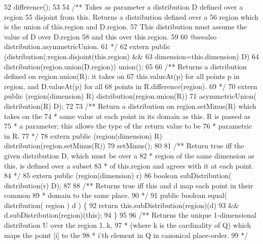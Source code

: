 \begin{tightcode}
\quad\num{52}        difference();
\quad\num{53}
\quad\num{54}    /** Takes as parameter a distribution D defined over a region
\quad\num{55}        disjoint from this. Returns a distribution defined over a
\quad\num{56}        region which is the union of this.region and D.region.
\quad\num{57}        This distribution must assume the value of D over D.region
\quad\num{58}        and this over this.region.
\quad\num{59}
\quad\num{60}        @seealso distribution.asymmetricUnion.
\quad\num{61}     */
\quad\num{62}    extern public (distribution(:region.disjoint(this.region) &&
\quad\num{63}                                dimension=this.dimension) D)
\quad\num{64}        distribution(region.union(D.region)) union();
\quad\num{65}
\quad\num{66}    /** Returns a distribution defined on region.union(R): it takes on
\quad\num{67}        this.valueAt(p) for all points p in region, and D.valueAt(p) for all
\quad\num{68}        points in R.difference(region).
\quad\num{69}     */
\quad\num{70}    extern public (region(dimension) R) distribution(region.union(R))
\quad\num{71}        asymmetricUnion( distribution(R) D);
\quad\num{72}
\quad\num{73}    /** Return a distribution on region.setMinus(R) which takes on the
\quad\num{74}     * same value at each point in its domain as this. R is passed as
\quad\num{75}     * a parameter; this allows the type of the return value to be
\quad\num{76}     * parametric in R.
\quad\num{77}     */
\quad\num{78}    extern public (region(dimension) R) distribution(region.setMinus(R))
\quad\num{79}        setMinus();
\quad\num{80}
\quad\num{81}    /** Return true iff the given distribution D, which must be over a
\quad\num{82}     * region of the same dimension as this, is defined over a subset
\quad\num{83}     * of this.region and agrees with it at each point.
\quad\num{84}     */
\quad\num{85}    extern public (region(dimension) r)
\quad\num{86}        boolean subDistribution( distribution(r) D);
\quad\num{87}
\quad\num{88}    /** Returns true iff this and d map each point in their common
\quad\num{89}     * domain to the same place.
\quad\num{90}     */
\quad\num{91}    public boolean equal( distribution( region ) d ) \{
\quad\num{92}        return this.subDistribution(region)(d)
\quad\num{93}            && d.subDistribution(region)(this);
\quad\num{94}    \}
\quad\num{95}
\quad\num{96}    /** Returns the unique 1-dimensional distribution U over the region 1..k,
\quad\num{97}     * (where k is the cardinality of Q) which maps the point [i] to the
\quad\num{98}     * i'th element in Q in canonical place-order.
\quad\num{99}     */

\end{tightcode}
